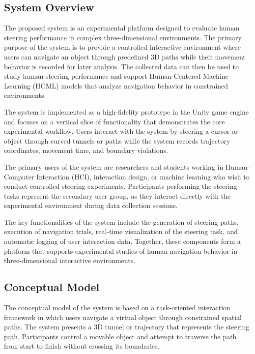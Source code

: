 \documentclass[sigconf]{acmart}
\begin{document}
\subsection{System Overview}

The proposed system is an experimental platform designed to evaluate human steering performance in complex three-dimensional environments. The primary purpose of the system is to provide a controlled interactive environment where users can navigate an object through predefined 3D paths while their movement behavior is recorded for later analysis. The collected data can then be used to study human steering performance and support Human-Centered Machine Learning (HCML) models that analyze navigation behavior in constrained environments.

The system is implemented as a high-fidelity prototype in the Unity game engine and focuses on a vertical slice of functionality that demonstrates the core experimental workflow. Users interact with the system by steering a cursor or object through curved tunnels or paths while the system records trajectory coordinates, movement time, and boundary violations.

The primary users of the system are researchers and students working in Human–Computer Interaction (HCI), interaction design, or machine learning who wish to conduct controlled steering experiments. Participants performing the steering tasks represent the secondary user group, as they interact directly with the experimental environment during data collection sessions.

The key functionalities of the system include the generation of steering paths, execution of navigation trials, real-time visualization of the steering task, and automatic logging of user interaction data. Together, these components form a platform that supports experimental studies of human navigation behavior in three-dimensional interactive environments.

\subsection{Conceptual Model}

The conceptual model of the system is based on a task-oriented interaction framework in which users navigate a virtual object through constrained spatial paths. The system presents a 3D tunnel or trajectory that represents the steering path. Participants control a movable object and attempt to traverse the path from start to finish without crossing its boundaries.
\end{document}
